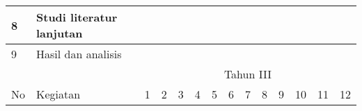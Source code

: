 \begin{spacing}{1.5}
\begin{table}[htp]
\begin{tabular}{|l|l|llllllllllll|}
			8                                          & Studi literatur lanjutan                                                             & \multicolumn{1}{l|}{}                         & \multicolumn{1}{l|}{}                         & \multicolumn{1}{l|}{}                         & \multicolumn{1}{l|}{}                         & \multicolumn{1}{l|}{}                         & \multicolumn{1}{l|}{}                         & \multicolumn{1}{l|}{}                         & \multicolumn{1}{l|}{\cellcolor[HTML]{343434}} & \multicolumn{1}{l|}{\cellcolor[HTML]{343434}} & \multicolumn{1}{l|}{\cellcolor[HTML]{343434}} & \multicolumn{1}{l|}{}                         &                          \\ \hline
			9                                          & Hasil dan analisis                                                                   & \multicolumn{1}{l|}{}                         & \multicolumn{1}{l|}{}                         & \multicolumn{1}{l|}{}                         & \multicolumn{1}{l|}{}                         & \multicolumn{1}{l|}{}                         & \multicolumn{1}{l|}{}                         & \multicolumn{1}{l|}{}                         & \multicolumn{1}{l|}{}                         & \multicolumn{1}{l|}{}                         & \multicolumn{1}{l|}{\cellcolor[HTML]{343434}} & \multicolumn{1}{l|}{\cellcolor[HTML]{343434}} & \cellcolor[HTML]{343434} \\ \hline
			\multicolumn{1}{|c|}{}                     &                                                                                      & \multicolumn{12}{c|}{Tahun III}                                                                                                                                                                                                                                                                                                                                                                                                                                                                                                                                          \\ \cline{3-14} 
			\multicolumn{1}{|c|}{\multirow{-2}{*}{No}} & \multirow{-2}{*}{Kegiatan}                                                           & \multicolumn{1}{c|}{1}                        & \multicolumn{1}{c|}{2}                        & \multicolumn{1}{c|}{3}                        & \multicolumn{1}{c|}{4}                        & \multicolumn{1}{c|}{5}                        & \multicolumn{1}{c|}{6}                        & \multicolumn{1}{c|}{7}                        & \multicolumn{1}{c|}{8}                        & \multicolumn{1}{c|}{9}                        & \multicolumn{1}{c|}{10}                       & \multicolumn{1}{c|}{11}                       & \multicolumn{1}{c|}{12}  \\ \hline

\end{tabular}
\end{table}
\end{spacing}
